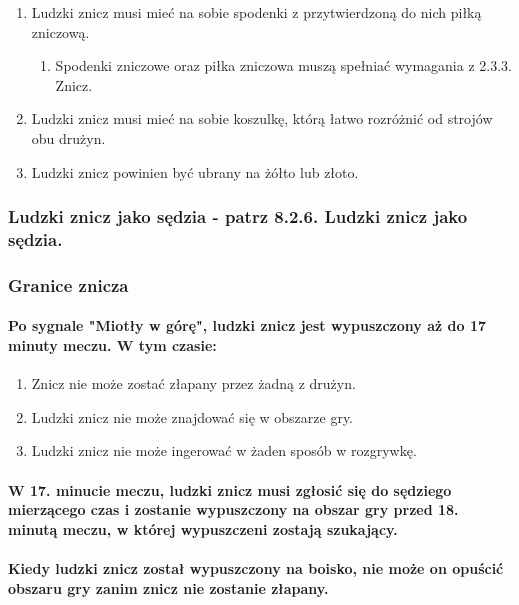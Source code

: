 \documentclass[12pt]{article}
\begin{document}
\begin{enumerate}
\item
    Ludzki znicz musi mieć na sobie spodenki z przytwierdzoną do nich
  piłką zniczową.
  
  \begin{enumerate}
  \item
        Spodenki zniczowe oraz piłka zniczowa muszą spełniać wymagania z
    2.3.3. Znicz.
      \end{enumerate}
\item
    Ludzki znicz musi mieć na sobie koszulkę, którą łatwo rozróżnić od
  strojów obu drużyn.
  \item
    Ludzki znicz powinien być ubrany na żółto lub złoto.
  \end{enumerate}

\subsubsection{Ludzki znicz jako sędzia - patrz 8.2.6. Ludzki znicz jako sędzia.}

\subsubsection{Granice znicza}

\paragraph{Po sygnale "Miotły w górę", ludzki znicz jest
wypuszczony aż do 17 minuty meczu. W tym czasie:}

\begin{enumerate}
\item Znicz nie może zostać złapany przez żadną z drużyn.

\item Ludzki znicz nie może znajdować się w obszarze gry.

\item Ludzki znicz nie może ingerować w żaden sposób w rozgrywkę.
\end{enumerate}

\paragraph{W 17. minucie meczu, ludzki znicz musi zgłosić się do
sędziego mierzącego czas i zostanie wypuszczony na obszar gry przed 18.
minutą meczu, w której wypuszczeni zostają szukający.}

\paragraph{Kiedy ludzki znicz został wypuszczony na boisko, nie
może on opuścić obszaru gry zanim znicz nie zostanie złapany.}
\end{document}
